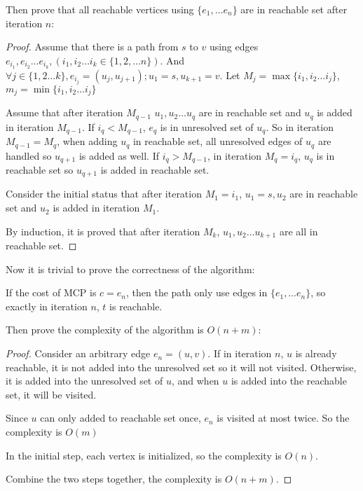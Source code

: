         Then prove that all reachable vertices using $\{e_1,\dots e_n\}$ are in reachable set after iteration $n$: 
    \begin{proof}[Proof]
        Assume that there is a path from $s$ to $v$ using edges $e_{i_1},e_{i_2}\dots e_{i_k},(i_1,i_2\dots i_k\in \{1,2,\dots n\})$. 
        And $\forall j\in \{1,2\dots k\},e_{i_j}=(u_j,u_{j+1});u_1=s,u_{k+1}=v$. 
        Let $M_j=\max\{i_1,i_2\dots i_j\}$, $m_j=\min\{i_1,i_2\dots i_j\}$

        Assume that after iteration $M_{q-1}$ $u_1,u_2\dots u_q$ are in reachable set and $u_q$ is added in iteration $M_{q-1}$. 
        If $i_q<M_{q-1}$, $e_q$ is in unresolved set of $u_q$. 
        So in iteration $M_{q-1}=M_q$, when adding $u_q$ in reachable set, 
        all unresolved edges of $u_q$ are handled so $u_{q+1}$ is added as well. 
        If $i_q>M_{q-1}$, in iteration $M_q=i_q$, $u_q$ is in reachable set so $u_{q+1}$ is added in reachable set. 

        Consider the initial status that after iteration $M_1=i_1$, $u_1=s,u_2$ are in reachable set and $u_2$ is added in iteration $M_1$. 

        By induction, it is proved that after iteration $M_k$, $u_1,u_2\dots u_{k+1}$ are all in reachable set. 
    \end{proof}
        Now it is trivial to prove the correctness of the algorithm: 
        
        If the cost of MCP is $c=e_n$, then the path only use edges in $\{e_1,\dots e_n\}$, so exactly in iteration $n$, $t$ is reachable. 

        Then prove the complexity of the algorithm is $O(n+m)$:
    \begin{proof}[Proof]
        Consider an arbitrary edge $e_n=(u,v)$. If in iteration $n$, $u$ is already reachable, 
        it is not added into the unresolved set so it will not visited. 
        Otherwise, it is added into the unresolved set of $u$, 
        and when $u$ is added into the reachable set, it will be visited. 

        Since $u$ can only added to reachable set once, $e_n$ is visited at most twice. So the complexity is $O(m)$

        In the initial step, each vertex is initialized, so the complexity is $O(n)$. 

        Combine the two steps together, the complexity is $O(n+m)$. 
    \end{proof} 



